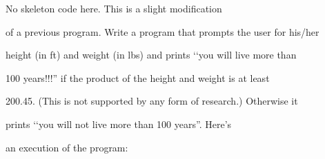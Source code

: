 No skeleton code here. This is a slight modification

of a previous program. Write a program that prompts the user for his/her

height (in ft) and weight (in lbs) and prints \lq\lq you will live more than

100 years!!!'' if the product of the height and weight is at least

200.45. (This is not supported by any form of research.) Otherwise it

prints \lq\lq you will not live more than 100 years''. Here's

an execution of the program:


